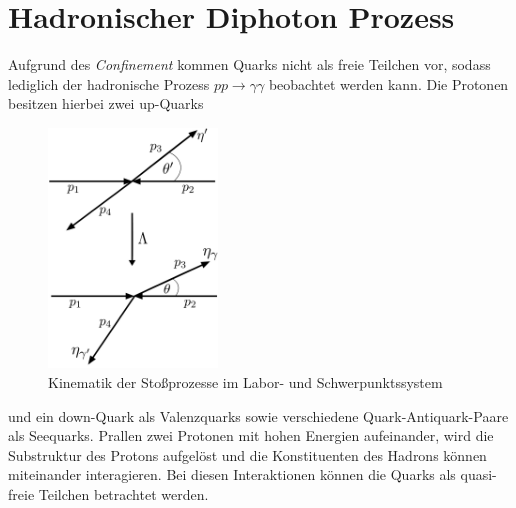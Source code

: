 \section{Hadronischer Diphoton Prozess}
Aufgrund des \textit{Confinement} kommen Quarks nicht als freie Teilchen vor, sodass lediglich der hadronische Prozess $pp \rightarrow \gamma \gamma$ beobachtet werden kann.  Die Protonen besitzen hierbei zwei up-Quarks
\begin{figure}
	\includegraphics[width=45mm]{graphics/Kinematik}
	\caption{Kinematik der Stoßprozesse im Labor- und Schwerpunktssystem}
	\label{Kinematik}
\end{figure}
   und ein down-Quark als Valenzquarks sowie verschiedene Quark-Antiquark-Paare als Seequarks. Prallen zwei Protonen mit hohen Energien aufeinander, wird die Substruktur des Protons aufgelöst und die Konstituenten des Hadrons können miteinander interagieren. Bei diesen Interaktionen können die Quarks als quasi-freie Teilchen betrachtet werden.

